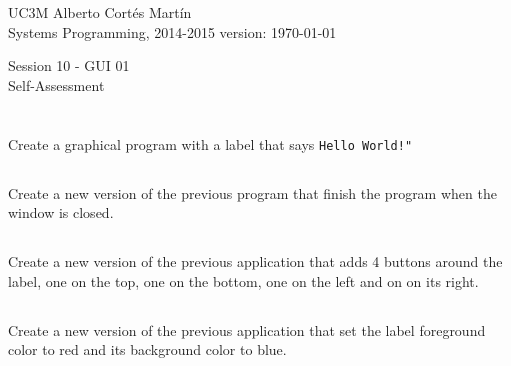 \documentclass[a4paper, 11pt]{article}
\newcommand{\realtitle}{Session 10 - GUI 01}
\begin{document}
\makebox[\linewidth]{\rule{\textwidth}{0.4pt}}
UC3M \hfill Alberto Cortés Martín\\
Systems Programming, 2014-2015 \hfill version: \today\\
\makebox[\linewidth]{\rule{\textwidth}{0.4pt}}
\begin{center}
  \Large{\realtitle}\\Self-Assessment
\end{center}
\makebox[\linewidth]{\rule{\textwidth}{0.4pt}}
\vspace{1cm}

\section{}

\subsection{}

Create a graphical program with a label that says \verb+Hello World!"+


\subsection{}

Create a new version of the previous program that finish the program when the window is closed.


\subsection{}

Create a new version of the previous application that adds 4 buttons around the
label, one on the top, one on the bottom, one on the left and on on its right.

\subsection{}

Create a new version of the previous application that set the label foreground
color to red and its background color to blue.

\section{}

\subsection{}
\end{document}
